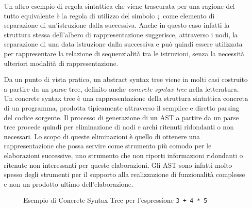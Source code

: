 Un altro esempio di regola sintattica che viene trascurata per una ragione del
tutto equivalente è la regola di utilizzo del simbolo \texttt{;} come elemento
di separazione di un’istruzione dalla successiva. Anche in questo caso infatti
la struttura stessa dell’albero di rappresentazione suggerisce, attraverso i
nodi, la separazione di una data istruzione dalla successiva e può quindi essere
utilizzata per rappresentare la relazione di sequenzialità tra le istruzioni,
senza la necessità ulteriori modalità di rappresentazione.

Da un punto di vista pratico, un abstract syntax tree viene in molti casi
costruito a partire da un parse tree, definito anche \textit{concrete syntax
tree} nella letteratura. Un concrete syntax tree è una rappresentazione della
struttura sintattica concreta di un programma, prodotta tipicamente attraverso
il semplice e diretto parsing del codice sorgente. Il processo di generazione di
un AST a partire da un parse tree procede quindi per eliminazione di nodi e
archi ritenuti ridondanti o non necessari. Lo scopo di queste eliminazioni è
quello di ottenere una rappresentazione che possa servire come strumento più
comodo per le elaborazioni successive, uno strumento che non riporti
informazioni ridondanti o ritenute non interessanti per queste elaborazioni. Gli
AST sono infatti molto spesso degli strumenti per il supporto alla realizzazione
di funzionalità complesse e non un prodotto ultimo dell’elaborazione.

\begin{figure}
\caption{Esempio di Concrete Syntax Tree per l'espressione \texttt{3 + 4 * 5}}
\label{fig:concrete-syntax-tree}
\end{figure}

